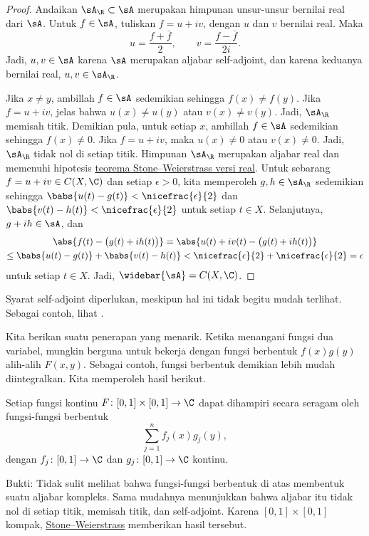\begin{proof}
Andaikan $\sA_\R \subset \sA$ merupakan himpunan unsur-unsur bernilai real
dari $\sA$.
Untuk $f \in \sA$, tuliskan $f = u+iv$, dengan $u$ dan $v$ bernilai real.
Maka
\begin{equation*}
u = \frac{f+\bar{f}}{2}, \qquad
v = \frac{f-\bar{f}}{2i} .
\end{equation*}
Jadi, $u, v \in \sA$ karena $\sA$ merupakan aljabar self-adjoint, dan karena
keduanya bernilai real, $u, v \in \sA_\R$.

Jika $x \neq y$, ambillah $f \in \sA$ sedemikian sehingga $f(x) \neq f(y)$.
Jika $f = u+iv$, jelas bahwa $u(x) \neq u(y)$ atau $v(x) \neq v(y)$.
Jadi, $\sA_\R$ memisah titik.
%
Demikian pula, untuk setiap $x$, ambillah $f \in \sA$ sedemikian sehingga
$f(x) \neq 0$. Jika $f = u+iv$, maka $u(x) \neq 0$ atau $v(x) \neq 0$.
Jadi, $\sA_\R$ tidak nol di setiap titik.
%
Himpunan $\sA_\R$ merupakan aljabar real dan memenuhi hipotesis
\hyperref[thm:SWreal]{teorema Stone--Weierstrass versi real}.
Untuk sebarang $f = u+iv \in C(X,\C)$ dan setiap $\epsilon>0$, kita
memperoleh $g,h \in \sA_\R$ sedemikian sehingga
$\babs{u(t)-g(t)} < \nicefrac{\epsilon}{2}$ dan
$\babs{v(t)-h(t)} < \nicefrac{\epsilon}{2}$ untuk setiap $t \in X$.
Selanjutnya, $g+i h \in \sA$, dan
\begin{multline*}
\abs{f(t) - \bigl(g(t)+ih(t)\bigr)} = 
\abs{u(t)+iv(t) - \bigl(g(t)+ih(t)\bigr)} \\
\leq
\babs{u(t)-g(t)}+\babs{v(t)-h(t)} < \nicefrac{\epsilon}{2} +
\nicefrac{\epsilon}{2} = \epsilon
\end{multline*}
untuk setiap $t \in X$.
Jadi, $\widebar{\sA} = C(X,\C)$.
\end{proof}

Syarat self-adjoint diperlukan, meskipun hal ini tidak begitu mudah terlihat.
Sebagai contoh, lihat .

Kita berikan suatu penerapan yang menarik.
Ketika menangani fungsi dua variabel, mungkin berguna untuk bekerja dengan
fungsi berbentuk $f(x)g(y)$ alih-alih $F(x,y)$. Sebagai contoh, fungsi berbentuk
demikian lebih mudah diintegralkan. Kita memperoleh hasil berikut.

\begin{example}
Setiap fungsi kontinu $F \colon [0,1] \times [0,1] \to \C$ dapat dihampiri
secara seragam oleh fungsi-fungsi berbentuk
\begin{equation*}
\sum_{j=1}^n f_j(x) g_j(y) ,
\end{equation*}
dengan $f_j \colon [0,1] \to \C$ dan $g_j \colon [0,1] \to \C$ kontinu.

Bukti:
Tidak sulit melihat bahwa fungsi-fungsi berbentuk di atas membentuk suatu
aljabar kompleks. Sama mudahnya menunjukkan bahwa aljabar itu tidak nol di
setiap titik, memisah titik, dan self-adjoint. Karena $[0,1] \times [0,1]$
kompak, \hyperref[thm:SWcomplex]{Stone--Weierstrass} memberikan hasil tersebut.
\end{example}

